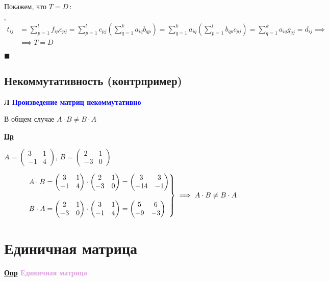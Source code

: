 \documentclass[12pt, a4paper]{report}
\newcommand{\sqbox}{%
	\collectbox{%
		\setlength{\fboxsep}{2pt}%
		\fbox{\BOXCONTENT}%
	}%
}
\newcommand{\df}[1][]{\begin{flushleft}\textbf{\underline{Опр} \textcolor{Plum}{#1}}\end{flushleft}}
\newcommand{\ex}{\begin{flushleft}\textbf{\underline{Пр}}\end{flushleft}}
\newcommand{\lm}[1][]{\begin{flushleft}\textbf{\sqbox{Л} \textcolor{Blue}{#1}}\end{flushleft}}
\begin{document}
	Покажем, что \(T=D\)\,:
	
	\smallskip \(\square\)
	\begin{align*}
		t_{ij}&=\sum_{p=1}^{l}f_{ip}c_{pj}=\sum_{p=1}^{l}c_{pj}\left(\sum_{q=1}^{k}a_{iq}b_{qp}\right)=\sum_{q=1}^{k}a_{iq}\left(\sum_{p=1}^{l}b_{qp}c_{pj}\right)=\sum_{q=1}^{k}a_{iq}g_{qj}=d_{ij}\implies\\[5pt]
			&\implies T = D
	\end{align*}
	
	\(\blacksquare\)
	\subsection{Некоммутативность (контрпример)}
	\lm[Произведение матриц некоммутативно]
	
	В общем случае \(A\cdot B\neq B\cdot A\)
	\ex
	
	\(A=\begin{pmatrix}3&1\\-1&4\end{pmatrix}\), \(B=\begin{pmatrix}2&1\\-3&0\end{pmatrix}\)
	
	\bigskip
	
	\[ 
	\begin{drcases}
	A\cdot B = \begin{pmatrix}3&1\\-1&4\end{pmatrix}\cdot\begin{pmatrix}2&1\\-3&0\end{pmatrix}=\begin{pmatrix}3&3\\-14&-1\end{pmatrix}\\[10pt]
	B\cdot A=\begin{pmatrix}2&1\\-3&0\end{pmatrix}\cdot\begin{pmatrix}3&1\\-1&4\end{pmatrix}=\begin{pmatrix}5&6\\-9&-3\end{pmatrix}
	\end{drcases}\implies A\cdot B\neq B\cdot A
	\]
	\section{Единичная матрица}
	\df[Единичная матрица]
	
\end{document}
